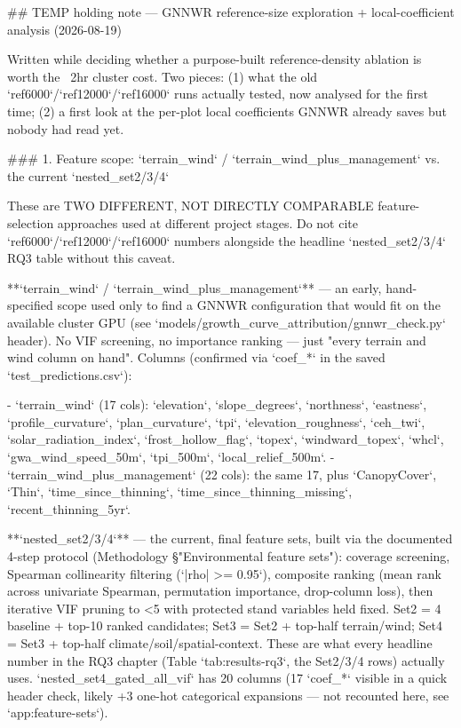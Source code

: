 ## TEMP holding note — GNNWR reference-size exploration + local-coefficient analysis (2026-08-19)

Written while deciding whether a purpose-built reference-density ablation is worth the ~2hr
cluster cost. Two pieces: (1) what the old `ref6000`/`ref12000`/`ref16000` runs actually tested,
now analysed for the first time; (2) a first look at the per-plot local coefficients GNNWR already
saves but nobody had read yet.

### 1. Feature scope: `terrain_wind` / `terrain_wind_plus_management` vs. the current `nested_set2/3/4`

These are TWO DIFFERENT, NOT DIRECTLY COMPARABLE feature-selection approaches used at different
project stages. Do not cite `ref6000`/`ref12000`/`ref16000` numbers alongside the headline
`nested_set2/3/4` RQ3 table without this caveat.

**`terrain_wind` / `terrain_wind_plus_management`** — an early, hand-specified scope used only to
find a GNNWR configuration that would fit on the available cluster GPU (see
`models/growth_curve_attribution/gnnwr_check.py` header). No VIF screening, no importance ranking
— just "every terrain and wind column on hand". Columns (confirmed via `coef_*` in the saved
`test_predictions.csv`):

- `terrain_wind` (17 cols): `elevation`, `slope_degrees`, `northness`, `eastness`,
  `profile_curvature`, `plan_curvature`, `tpi`, `elevation_roughness`, `ceh_twi`,
  `solar_radiation_index`, `frost_hollow_flag`, `topex`, `windward_topex`, `whcl`,
  `gwa_wind_speed_50m`, `tpi_500m`, `local_relief_500m`.
- `terrain_wind_plus_management` (22 cols): the same 17, plus `CanopyCover`, `Thin`,
  `time_since_thinning`, `time_since_thinning_missing`, `recent_thinning_5yr`.

**`nested_set2/3/4`** — the current, final feature sets, built via the documented 4-step protocol
(Methodology §"Environmental feature sets"): coverage screening, Spearman collinearity filtering
(`|rho| >= 0.95`), composite ranking (mean rank across univariate Spearman, permutation importance,
drop-column loss), then iterative VIF pruning to <5 with protected stand variables held fixed.
Set2 = 4 baseline + top-10 ranked candidates; Set3 = Set2 + top-half terrain/wind; Set4 = Set3 +
top-half climate/soil/spatial-context. These are what every headline number in the RQ3 chapter
(Table `tab:results-rq3`, the Set2/3/4 rows) actually uses. `nested_set4_gated_all_vif` has 20
columns (17 `coef_*` visible in a quick header check, likely +3 one-hot categorical expansions —
not recounted here, see `app:feature-sets`).

